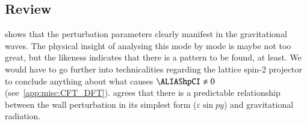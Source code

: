 




\subsection{Review}
    
    
     shows that the perturbation parameters clearly manifest in the gravitational waves. The physical insight of analysing this mode by mode is maybe not too great, but the likeness indicates that there is a pattern to be found, at least. We would have to go further into technicalities regarding the lattice spin-2 projector to conclude anything about what causes $\hpCI\neq 0$ (see~\cref{app:misc:CFT_DFT}). 
     agrees that there is a predictable relationship between the wall perturbation in its simplest form ($\varepsilon \sin{py}$) and gravitational radiation. 


